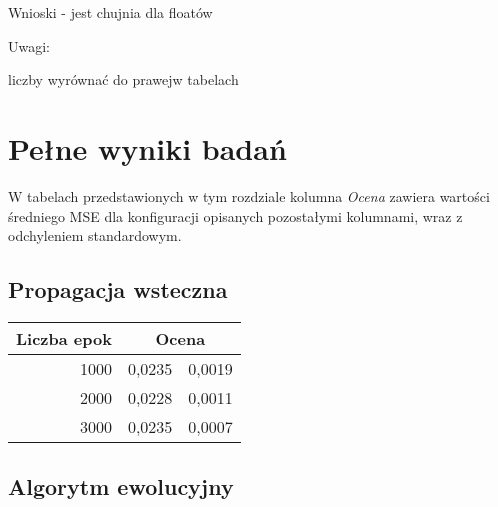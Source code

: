 \documentclass[11pt,a4paper,oneside]{report}
\begin{document}
Wnioski - jest chujnia dla floatów

Uwagi:

liczby wyrównać do prawejw tabelach





\appendix 
\chapter{Pełne wyniki badań}

W tabelach przedstawionych w tym rozdziale kolumna \textit{Ocena} zawiera wartości średniego MSE dla konfiguracji opisanych pozostałymi kolumnami, wraz z odchyleniem standardowym.

\section{Propagacja wsteczna}

\begin{center}
	\begin{longtable}{|r|r@{$\pm$}r|}
		\hline
		\multicolumn{1}{|c|}{Liczba epok} & \multicolumn{2}{|c|}{Ocena}\\ \hline \hline\endhead
		1000 & 0,0235 & 0,0019 \\ \hline
		2000 & 0,0228 & 0,0011\\ \hline
		3000 & 0,0235 & 0,0007\\ \hline
	\end{longtable}
\end{center}

\section{Algorytm ewolucyjny}
\end{document}
